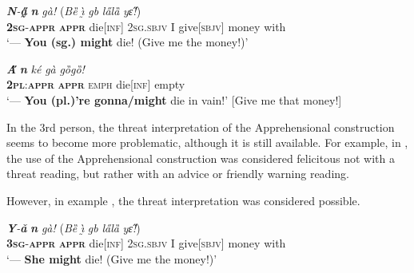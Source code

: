 \documentclass[output=paper,colorlinks,citecolor=brown
]{langscibook}
\begin{document}
\ea \label{ex:Fed33}
\gll \textit{\textbf{N}-\textbf{a̰̋}} \textit{\textbf{n{\ù}}} \textit{gà!} \textup{(}\textit{Bȅ} \textit{ı̰̀} \textit{gb{\à}} \textit{la̋lȁ} \textit{yɛ̋!}\textup{)} \\
\textsc{\textbf{2sg}-\textbf{appr}} \textsc{\textbf{appr}} die[\textsc{inf}]  \textsc{2sg.sbjv} I give\textsc{[sbjv]} money with \\
\glt [A robber:] `--- \textbf{You (sg.) might} die! (Give me the money!)'
\z


\ea \label{ex:Fed34}
\gll \textit{\textbf{A̋}} \textit{\textbf{n{\ù}}} \textit{ké} \textit{gà} \textit{gȍgȍ!} \\
\textsc{\textbf{2pl}:\textbf{appr}} \textsc{\textbf{appr}} \textsc{emph} die[\textsc{inf}] empty \\
\glt [A robber:] `— \textbf{You (pl.)'re gonna/might} die in vain!' [Give me that money!]
\z


 In the 3rd person, the threat interpretation of the Apprehensional construction seems to become more problematic, although it is still available. For example, in , the use of the Apprehensional construction was considered felicitous not with a threat reading, but rather with an advice or friendly warning reading.


\z

 However, in example , the threat interpretation was considered possible.


\ea \label{ex:Fed36}
\gll \textit{\textbf{Y}-\textbf{ǎ}} \textit{\textbf{n{\ù}}} \textit{gà!}  \textup{(}\textit{Bȅ} \textit{ı̰̀} \textit{gb{\à}} \textit{la̋lȁ} \textit{yɛ̋!}\textup{)} \\
\textsc{\textbf{3sg}-\textbf{appr}} \textsc{\textbf{appr}} die\textsc{[inf]} \textsc{2sg.sbjv} I give[\textsc{sbjv}] money with \\
 `--- \textbf{She might} die! (Give me the money!)'
\z
\end{document}
